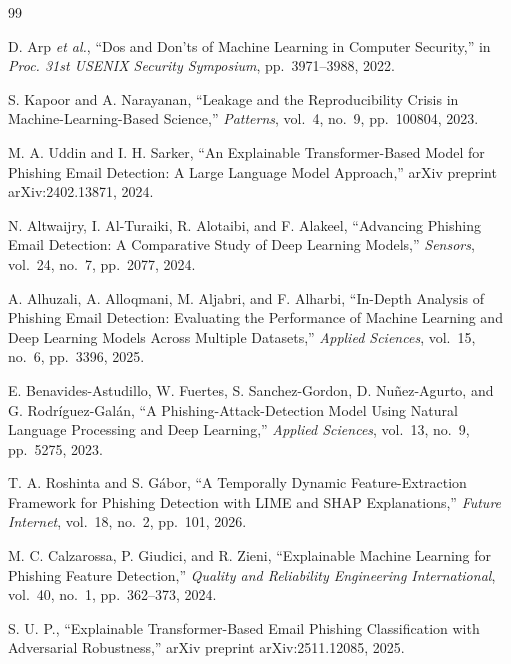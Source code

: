 \renewcommand{\bibname}{References}
\begin{thebibliography}{99}

D. Arp \textit{et al.}, ``Dos and Don'ts of Machine Learning in Computer Security,'' in \textit{Proc. 31st USENIX Security Symposium}, pp.~3971--3988, 2022.

S. Kapoor and A. Narayanan, ``Leakage and the Reproducibility Crisis in Machine-Learning-Based Science,'' \textit{Patterns}, vol.~4, no.~9, pp.~100804, 2023.

M. A. Uddin and I. H. Sarker, ``An Explainable Transformer-Based Model for Phishing Email Detection: A Large Language Model Approach,'' arXiv preprint arXiv:2402.13871, 2024.

N. Altwaijry, I. Al-Turaiki, R. Alotaibi, and F. Alakeel, ``Advancing Phishing Email Detection: A Comparative Study of Deep Learning Models,'' \textit{Sensors}, vol.~24, no.~7, pp.~2077, 2024.

A. Alhuzali, A. Alloqmani, M. Aljabri, and F. Alharbi, ``In-Depth Analysis of Phishing Email Detection: Evaluating the Performance of Machine Learning and Deep Learning Models Across Multiple Datasets,'' \textit{Applied Sciences}, vol.~15, no.~6, pp.~3396, 2025.

E. Benavides-Astudillo, W. Fuertes, S. Sanchez-Gordon, D. Nu{\~n}ez-Agurto, and G. Rodr{\'i}guez-Gal{\'a}n, ``A Phishing-Attack-Detection Model Using Natural Language Processing and Deep Learning,'' \textit{Applied Sciences}, vol.~13, no.~9, pp.~5275, 2023.

T. A. Roshinta and S. G{\'a}bor, ``A Temporally Dynamic Feature-Extraction Framework for Phishing Detection with {LIME} and {SHAP} Explanations,'' \textit{Future Internet}, vol.~18, no.~2, pp.~101, 2026.

M. C. Calzarossa, P. Giudici, and R. Zieni, ``Explainable Machine Learning for Phishing Feature Detection,'' \textit{Quality and Reliability Engineering International}, vol.~40, no.~1, pp.~362--373, 2024.

S. U. P., ``Explainable Transformer-Based Email Phishing Classification with Adversarial Robustness,'' arXiv preprint arXiv:2511.12085, 2025.


\end{thebibliography}
